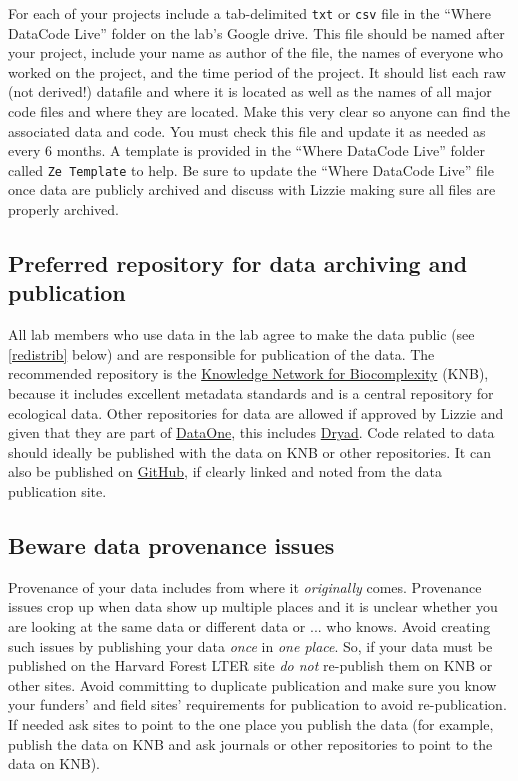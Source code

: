 \documentclass[11pt,a4paper,oneside]{article}
\begin{document}
For each of your projects include a tab-delimited \verb|txt| or \verb|csv| file in the ``Where DataCode Live'' folder on the lab's Google drive. This file should be named after your project, include your name as author of the file, the names of everyone who worked on the project, and the time period of the project. It should list each raw (not derived!) datafile and where it is located as well as the names of all major code files and where they are located. Make this very clear so anyone can find the associated data and code. You must check this file and update it as needed as every 6 months. A template is provided in the ``Where DataCode Live'' folder called \verb|Ze Template| to help. Be sure to update the ``Where DataCode Live'' file once data are publicly archived and discuss with Lizzie making sure all files are properly archived.

\subsection{Preferred repository for data archiving and publication}
All lab members who use data in the lab agree to make the data public (see \ref{redistrib} below) and are responsible for publication of the data. The recommended repository is the \href{http://knb.ecoinformatics.org/}{Knowledge Network for Biocomplexity} (KNB), because it includes excellent metadata standards and is a central repository for ecological data. Other repositories for data are allowed if approved by Lizzie and given that they are part of \href{https://www.dataone.org/}{DataOne}, this includes \href{http://datadryad.org/}{Dryad}. Code related to data should ideally be published with the data on KNB or other repositories. It can also be published on \href{https://github.com/}{GitHub}, if clearly linked and noted from the data publication site.

\subsection{Beware data provenance issues}
Provenance of your data includes from where it \emph{originally} comes. Provenance issues crop up when data show up multiple places and it is unclear whether you are looking at the same data or different data or ... who knows. Avoid creating such issues by publishing your data \emph{once} in \emph{one place}. So, if your data must be published on the Harvard Forest LTER site \emph{do not} re-publish them on KNB or other sites. Avoid committing to duplicate publication and make sure you know your funders' and field sites' requirements for publication to avoid re-publication. If needed ask sites to point to the one place you publish the data (for example, publish the data on KNB and ask journals or other repositories to point to the data on KNB).
\end{document}
